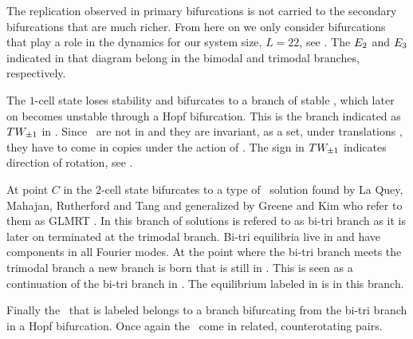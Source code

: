 The replication observed in primary bifurcations is not carried to the secondary bifurcations that are
much richer. From here on we only consider bifurcations that play a role in the dynamics for our system size, $L=22$, see . The $E_{2}$ and $E_{3}$ indicated in that diagram belong
in the bimodal and trimodal branches, respectively.

The $1$-cell state loses stability and bifurcates to a branch of stable
\reqva, which later on becomes unstable through a Hopf bifurcation. 
This is the branch indicated as $TW_{\pm1}$ in . Since \reqva\ are not in 
and they are invariant, as a set, under translations , they have to come in copies
under the action of . The sign in $TW_{\pm1}$ indicates direction of rotation, see .

At point $C$ in  the $2$-cell state bifurcates to a type of
\eqv\ solution found by La Quey, Mahajan, Rutherford and Tang and generalized by Greene and Kim who refer to them as GLMRT \eqva. In  this branch of solutions is refered to as bi-tri branch as it is later on terminated at the trimodal branch. Bi-tri equilibria live in  and have components
in all Fourier modes. At the point where the bi-tri branch
meets the trimodal branch a new branch is born that is still in . This is seen as a continuation
of the bi-tri branch in . The equilibrium labeled  in  is in
this branch.

Finally the \reqv\ that is labeled  belongs to a branch bifurcating from the bi-tri branch in
a Hopf bifurcation. Once again the \reqva\ come in  related, counterotating pairs.




